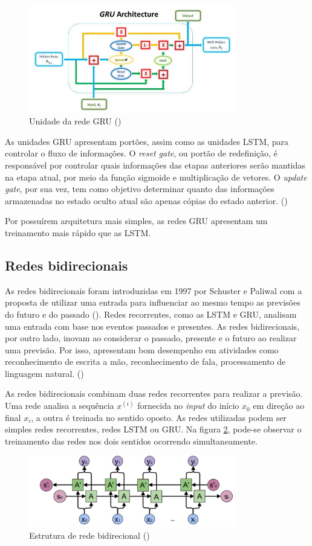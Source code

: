 \begin{figure}[H]
  \centering
  \includegraphics[width=9cm]{../figuras/redes/gru-cell.png}
  \caption{Unidade da rede GRU (\cite{deeplearningbook})}
  \label{fig:gru-cell}
\end{figure}

As unidades GRU apresentam portões, assim como as unidades LSTM,
para controlar o fluxo de informações. O \textit{reset gate}, ou
portão de redefinição, é responsável por controlar quais informações 
das etapas anteriores serão mantidas na etapa atual, por meio 
da função sigmoide e multiplicação de vetores. O \textit{update gate},
por sua vez, tem como objetivo determinar quanto das informações
armazenadas no estado oculto atual são apenas cópias do estado anterior. (\cite{d2l})

Por possuírem arquitetura mais simples, as redes GRU 
apresentam um treinamento mais rápido que as LSTM.

\subsection{Redes bidirecionais}

As redes bidirecionais foram introduzidas em 1997 por Schuster e Paliwal com a 
proposta de utilizar uma entrada para influenciar ao mesmo tempo as previsões 
do futuro e do passado (\cite{brnn}).
Redes recorrentes, como as LSTM e GRU, analisam uma entrada com base nos 
eventos passados e presentes. As redes bidirecionais, por outro lado, inovam ao 
considerar o passado, presente e o futuro ao realizar uma previsão. Por isso, 
apresentam bom desempenho em atividades como reconhecimento de escrita a mão, reconhecimento de
fala, processamento de linguagem natural. (\cite{bidirectional})

As redes bidirecionais combinam duas redes recorrentes para realizar a previsão. 
Uma rede analisa a sequência $x^{(i)}$
fornecida no \textit{input} do início $x_0$ em direção ao final $x_i$, a outra é treinada
no sentido oposto. As redes utilizadas podem ser simples redes 
recorrentes, redes LSTM ou GRU. Na figura \ref{fig:bi}, pode-se observar o 
treinamento das redes nos dois sentidos ocorrendo simultaneamente.

\begin{figure}[H]
  \centering
  \includegraphics[width=9cm]{../figuras/redes/bi.png}
  \caption{Estrutura de rede bidirecional (\cite{bidirectional})}
  \label{fig:bi}
\end{figure}
